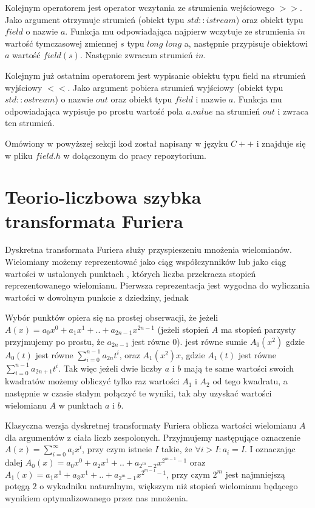 \documentclass{article}
\begin{document}
Kolejnym operatorem jest operator wczytania ze strumienia wejściowego $>>$.
Jako argument otrzymuje strumień (obiekt typu
$std::istream$) oraz obiekt typu $field$ o nazwie $a$.
Funkcja mu odpowiadająca najpierw wczytuje ze strumienia $in$ wartość tymczasowej zmiennej $s$ typu $long$ $long$
a, następnie przypisuje obiektowi $a$ wartość $field(s)$. Następnie zwracam strumień $in$.

Kolejnym już ostatnim operatorem jest wypisanie obiektu typu field na strumień wyjściowy
$<<$. Jako argument pobiera strumień wyjściowy (obiekt typu $std::ostream$) o nazwie $out$ oraz 
obiekt typu $field$ i nazwie $a$. Funkcja mu odpowiadająca wypisuje po prostu wartość pola 
$a.value$ na strumień $out$ i zwraca ten strumień. 

Omówiony w powyższej sekcji kod został napisany w języku $C++$ i znajduje się w 
pliku $field.h$ w dołączonym do pracy repozytorium.







\section{Teorio-liczbowa szybka transformata Furiera}

Dyskretna transformata Furiera służy przyspieszeniu mnożenia wielomianów. 
Wielomiany możemy reprezentować jako ciąg współczynników lub jako ciąg wartości w ustalonych punktach 
, których liczba przekracza stopień reprezentowanego wielomianu. Pierwsza reprezentacja jest wygodna
do wyliczania wartości w dowolnym punkcie z dziedziny, jednak 

Wybór punktów opiera się na prostej obserwacji, że jeżeli $A(x) = a_0x^0+a_1x^1+..+a_{2n-1}x^{2n-1}$
(jeżeli stopień $A$ ma stopień parzysty przyjmujemy po prostu, że $a_{2n-1}$ jest równe $0$). jest równe
sumie $A_0(x^2)$ gdzie $A_0(t)$ jest równe $\sum_{i=0}^{n-1}a_{2n}t^{i}$, oraz 
$A_1(x^2)x$, gdzie $A_1(t)$ jest równe $\sum_{i=0}^{n-1}a_{2n+1}t^{i}$. Tak więc jeżeli dwie
liczby $a$ i $b$ mają te same wartości swoich kwadratów możemy obliczyć tylko raz wartości $A_1$ i $A_2$
od tego kwadratu, a następnie w czasie stałym połączyć te wyniki, tak aby uzyskać wartości 
wielomianu $A$ w punktach $a$ i $b$. 


Klasyczna wersja dyskretnej transformaty Furiera oblicza wartości wielomianu $A$ dla
argumentów z ciała liczb zespolonych. Przyjmujemy następujące oznaczenie $A(x)=\sum_{i=0}^{\infty}a_ix^i$,
przy czym istneie $I$ takie, że $\forall i>I: a_i = I$. I oznaczając dalej 
 $A_0(x) = a_0x^0+a_2x^1+..+a_{2^m-2}x^{2^{m-1}-1} $
oraz $A_1(x) = a_1x^1+a_3x^1+..+a_{2^m-1}x^{2^{m-1}-1} $, przy czym $2^m$ jest najmniejszą
potęgą $2$ o wykadniku naturalnym, większym niż stopień wielomianu będącego wynikiem optymalizowanego 
przez nas mnożenia. 
\end{document}
